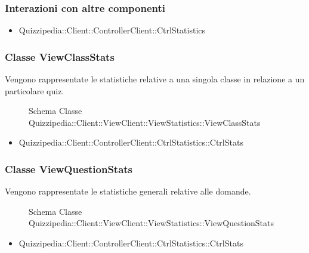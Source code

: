 \subsubsection{Interazioni con altre componenti}
\begin{itemize}
\item Quizzipedia::Client::ControllerClient::CtrlStatistics
\end{itemize}
\subsubsection{Classe ViewClassStats}
Vengono rappresentate le statistiche relative a una singola classe in relazione a un particolare quiz.
\begin{figure}[H]
\centering
\noindent{}
\caption[Schema Classe ViewClassStats]{Schema Classe Quizzipedia::Client::ViewClient::ViewStatistics::ViewClassStats}
\end{figure}
\begin{itemize}
\item Quizzipedia::Client::ControllerClient::CtrlStatistics::CtrlStats
\end{itemize}
\subsubsection{Classe ViewQuestionStats}
Vengono rappresentate le statistiche generali relative alle domande.
\begin{figure}[H]
\centering
\noindent{}
\caption[Schema Classe ViewQuestionStats]{Schema Classe Quizzipedia::Client::ViewClient::ViewStatistics::ViewQuestionStats}
\end{figure}
\begin{itemize}
\item Quizzipedia::Client::ControllerClient::CtrlStatistics::CtrlStats
\end{itemize}

